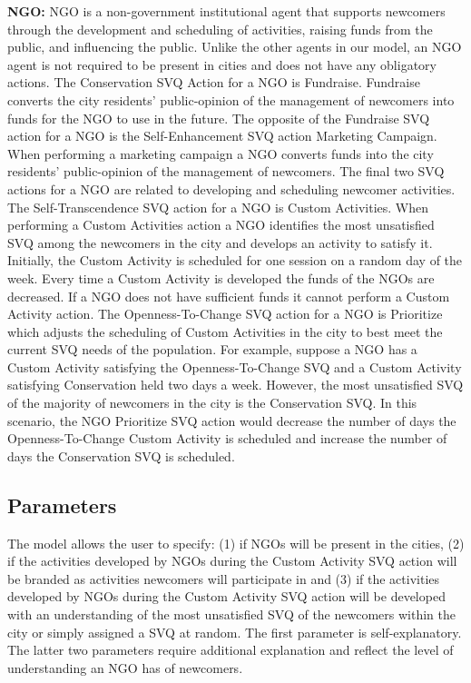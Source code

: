 \documentclass{scspaperproc}
\theoremstyle{scsthe}
\begin{document}
{\bf NGO:} NGO is a non-government institutional agent that supports newcomers through the development and scheduling of activities, raising funds from the public, and influencing the public. Unlike the other agents in our model, an NGO agent is not required to be present in cities and does not have any obligatory actions. The Conservation SVQ Action for a NGO is Fundraise. Fundraise converts the city residents' public-opinion of the management of newcomers into funds for the NGO to use in the future. The opposite of the Fundraise SVQ action for a NGO is the Self-Enhancement SVQ action Marketing Campaign. When performing a marketing campaign a NGO converts funds into the city residents' public-opinion of the management of newcomers. The final two SVQ actions for a NGO are related to developing and scheduling newcomer activities. The Self-Transcendence SVQ action for a NGO is Custom Activities. When performing a Custom Activities action a NGO identifies the most unsatisfied SVQ among the newcomers in the city and develops an activity to satisfy it. Initially, the Custom Activity is scheduled for one session on a random day of the week. Every time a Custom Activity is developed the funds of the NGOs are decreased. If a NGO does not have sufficient funds it cannot perform a Custom Activity action. The Openness-To-Change SVQ action for a NGO is Prioritize which adjusts the scheduling of Custom Activities in the city to best meet the current SVQ needs of the population. For example, suppose a NGO has a Custom Activity satisfying the Openness-To-Change SVQ and a Custom Activity satisfying Conservation held two days a week. However, the most unsatisfied SVQ of the majority of newcomers in the city is the Conservation SVQ. In this scenario, the NGO Prioritize SVQ action would decrease the number of days the Openness-To-Change Custom Activity is scheduled and increase the number of days the Conservation SVQ is scheduled.

\subsection{Parameters}
The model allows the user to specify: (1) if NGOs will be present in the cities, (2) if the activities developed by NGOs during the Custom Activity SVQ action will be branded as activities newcomers will participate in and (3) if the activities developed by NGOs during the Custom Activity SVQ action will be developed with an understanding of the most unsatisfied SVQ of the newcomers within the city or simply assigned a SVQ at random. The first parameter is self-explanatory. The latter two parameters require additional explanation and reflect the level of understanding an NGO has of newcomers. 
\end{document}

